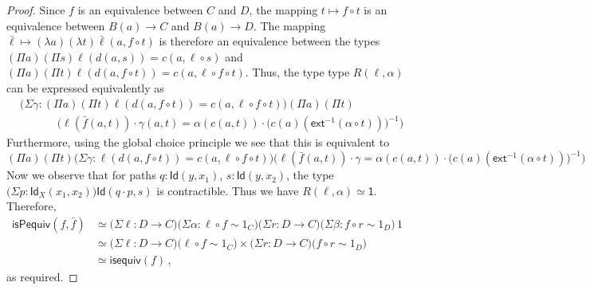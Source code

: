 \documentclass[reqno,10pt,a4paper,oneside]{amsart}
\numberwithin{equation}{section}
\theoremstyle{mythm}
\theoremstyle{mydef}
\theoremstyle{myrmk}
\newcommand{\co}{\colon}
\newcommand{\comp}{\circ}
\newcommand{\isequiv}{\mathsf{isequiv}}
\newcommand{\ext}{\mathsf{ext}}
\newcommand{\ct}{\cdot}
\newcommand{\Id}{\mathsf{Id}}
\newcommand{\one}{\mathsf{1}}
\begin{document}
\begin{proof}
Since $f$ is an equivalence between $C$ and $D$, the mapping $t \mapsto f \comp t$ is an equivalence between $B(a) \to C$ and $B(a) \to D$. The mapping $\bar{\ell} \mapsto (\lambda a) (\lambda t) \bar{\ell}(a,f \comp t)$ is therefore an equivalence between the types $(\Pi a) (\Pi s) \ell(d(a,s)) = c(a,\ell \comp s)$ and $(\Pi a) (\Pi t) \ell(d(a,f \comp t)) = c(a,\ell \comp f \comp t)$. Thus, the type type $R(\ell,\alpha)$ can be expressed equivalently as
\begin{align*}
& \big(\Sigma \gamma : (\Pi a) (\Pi t) \ell(d(a,f \circ t))=c(a,\ell \circ f \circ t)\big) (\Pi a) (\Pi t) \\ & \;\;\;\;\;\;\;\;\;\;\;\; \Big(\ell(\bar{f}(a,t)) \ct \gamma(a,t) = \alpha(c(a,t)) \ct \big(c(a)(\ext^{-1}(\alpha \circ t))\big)^{-1}\Big)
\end{align*}
Furthermore, using the global choice principle we see that this is equivalent to
\[ (\Pi a) (\Pi t) \big(\Sigma \gamma : \ell(d(a,f \circ t))=c(a,\ell \circ f \circ t)\big) \Big(\ell(\bar{f}(a,t)) \ct \gamma = \alpha(c(a,t)) \ct \big(c(a)(\ext^{-1}(\alpha \circ t))\big)^{-1}\Big) \]
Now we observe that for paths $q : \Id(y,x_1)$, $s : \Id(y,x_2)$, the type $\big(\Sigma p : \Id_X(x_1,x_2)\big) \Id(q \ct p,s)$ is contractible. Thus we have $R(\ell,\alpha) \simeq \one$. Therefore,
\begin{align*} 
\mathsf{isPequiv}(f,\bar{f}) 
  & \simeq   \big(\Sigma \ell \co D \to C \big) \big(\Sigma \alpha : \ell \comp f \sim 1_C \big) \big(\Sigma r  \co D \to C \big) 
 \big(\Sigma \beta \co f \comp r \sim 1_D \big) \, 1 \\
 & \simeq \big(\Sigma \ell \co D \to C \big)  \big( \ell \comp f \sim 1_C \big) \times 
 \big(\Sigma r  \co D \to C \big) \big( f \comp r \sim 1_D \big) \\
 & \simeq \isequiv(f) \, ,
\end{align*} 
as required.
\end{proof}
\end{document}
